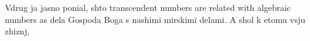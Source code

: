 

   Vdrug ja jasno ponial, shto  transcendent numbers
are related with algebraic numbers as
dela Gospoda Boga s nashimi mirskimi delami.
   A shol k etomu vsju zhiznj,

\bye
      
